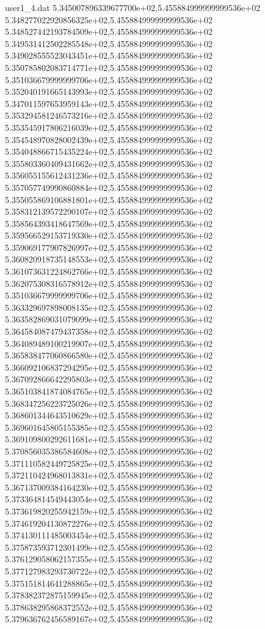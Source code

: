 \begin{filecontents}{user1_4.dat}
5.345007896339677700e+02,5.455884999999999536e+02
5.348277022920856325e+02,5.455884999999999536e+02
5.348527442193784509e+02,5.455884999999999536e+02
5.349531412502285548e+02,5.455884999999999536e+02
5.349028555523043451e+02,5.455884999999999536e+02
5.350785802083714771e+02,5.455884999999999536e+02
5.351036679999999706e+02,5.455884999999999536e+02
5.352040191665143993e+02,5.455884999999999536e+02
5.347011597653959143e+02,5.455884999999999536e+02
5.353294581246573216e+02,5.455884999999999536e+02
5.353545917806216039e+02,5.455884999999999536e+02
5.354548970828002439e+02,5.455884999999999536e+02
5.354048866715435224e+02,5.455884999999999536e+02
5.355803360409431662e+02,5.455884999999999536e+02
5.356055155612431236e+02,5.455884999999999536e+02
5.357057749990860884e+02,5.455884999999999536e+02
5.355055869106881801e+02,5.455884999999999536e+02
5.358312139572290107e+02,5.455884999999999536e+02
5.358564393418647569e+02,5.455884999999999536e+02
5.359566529153719330e+02,5.455884999999999536e+02
5.359069177907826997e+02,5.455884999999999536e+02
5.360820918735148553e+02,5.455884999999999536e+02
5.361073631224862766e+02,5.455884999999999536e+02
5.362075308316578912e+02,5.455884999999999536e+02
5.351036679999999706e+02,5.455884999999999536e+02
5.363329697898008135e+02,5.455884999999999536e+02
5.363582869031079099e+02,5.455884999999999536e+02
5.364584087479437358e+02,5.455884999999999536e+02
5.364089489100219907e+02,5.455884999999999536e+02
5.365838477060866580e+02,5.455884999999999536e+02
5.366092106837294295e+02,5.455884999999999536e+02
5.367092866642295803e+02,5.455884999999999536e+02
5.365103841874084765e+02,5.455884999999999536e+02
5.368347256223725026e+02,5.455884999999999536e+02
5.368601344643510629e+02,5.455884999999999536e+02
5.369601645805155385e+02,5.455884999999999536e+02
5.369109800292611681e+02,5.455884999999999536e+02
5.370856035386584608e+02,5.455884999999999536e+02
5.371110582449725825e+02,5.455884999999999536e+02
5.372110424968013831e+02,5.455884999999999536e+02
5.367137009384164230e+02,5.455884999999999536e+02
5.373364814549443054e+02,5.455884999999999536e+02
5.373619820255942159e+02,5.455884999999999536e+02
5.374619204130872276e+02,5.455884999999999536e+02
5.374130111485003454e+02,5.455884999999999536e+02
5.375873593712301499e+02,5.455884999999999536e+02
5.376129058062157355e+02,5.455884999999999536e+02
5.377127983293730722e+02,5.455884999999999536e+02
5.375151814641288865e+02,5.455884999999999536e+02
5.378382372875159945e+02,5.455884999999999536e+02
5.378638295868372552e+02,5.455884999999999536e+02
5.379636762456589167e+02,5.455884999999999536e+02

\end{filecontents}
